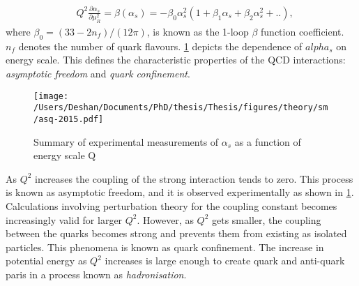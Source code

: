 \begin{equation}
    \label{eq:rge}
    \begin{aligned}
        & Q^2 \frac{\partial\alpha_s}{\partial\mu_R^2} = \beta(\alpha_s) = -\beta_0\alpha_s^2(1+\beta_1\alpha_s + \beta_2\alpha_s^2+ ..),
     \end{aligned}
\end{equation}
where $\beta_0 = (33-2n_f)/(12\pi)$, is known as the 1-loop $\beta$ function coefficient. $n_f$ denotes the number of quark flavours. \cref{fig:alphasrun} depicts the dependence of $alpha_s$ on energy scale. This defines the characteristic properties of the QCD interactions: \emph{asymptotic freedom} and \emph{quark confinement}. 
\begin{figure}[!htpb]
    \centering
    \texttt{[image: /Users/Deshan/Documents/PhD/thesis/Thesis/figures/theory/sm/asq-2015.pdf]}
    \caption{Summary of experimental measurements of $\alpha_s$ as a function of energy scale Q~\cite{PDG}}
    \label{fig:alphasrun}
\end{figure}
As $Q^2$ increases the coupling of the strong interaction tends to zero. This process is known as asymptotic freedom, and it is observed experimentally as shown in \cref{fig:alphasrun}. Calculations involving perturbation theory for the coupling constant becomes increasingly valid for larger $Q^2$. However, as $Q^2$ gets smaller, the coupling between the quarks becomes strong and prevents them from existing as isolated particles. This phenomena is known as quark confinement. The increase in potential energy as $Q^2$ increases is large enough to create quark and anti-quark paris in a process known as \emph{hadronisation}. 

